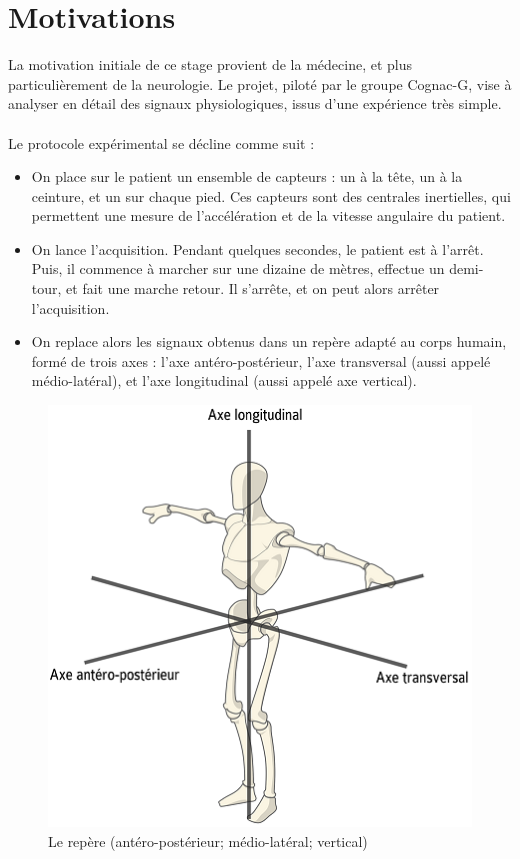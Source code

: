 \documentclass[french,12pt,notitlepage]{report}
\begin{document}
	\section{Motivations}
		La motivation initiale de ce stage provient de la médecine, et plus particulièrement de la neurologie. Le projet, piloté par le groupe Cognac-G, vise à analyser en détail des signaux physiologiques, issus d'une expérience très simple.
	\\ \\
	Le protocole expérimental se décline comme suit :
	\begin{itemize}
		\item On place sur le patient un ensemble de capteurs : un à la tête, un à la ceinture, et un sur chaque pied. Ces capteurs sont des centrales inertielles, qui permettent une mesure de l'accélération et de la vitesse angulaire du patient.
		\item On lance l'acquisition. Pendant quelques secondes, le patient est à l'arrêt. Puis, il commence à marcher sur une dizaine de mètres, effectue un demi-tour, et fait une marche retour. Il s'arrête, et on peut alors arrêter l'acquisition.
		\item On replace alors les signaux obtenus dans un repère adapté au corps humain, formé de trois axes : l'axe antéro-postérieur, l'axe transversal (aussi appelé médio-latéral), et l'axe longitudinal (aussi appelé axe vertical).
	\end{itemize}

	\begin{figure}[!h]
		\includegraphics[scale=0.3]{axis.png}
		\caption{Le repère (antéro-postérieur; médio-latéral; vertical)}
		\label{axis}
	\end{figure}
\end{document}
